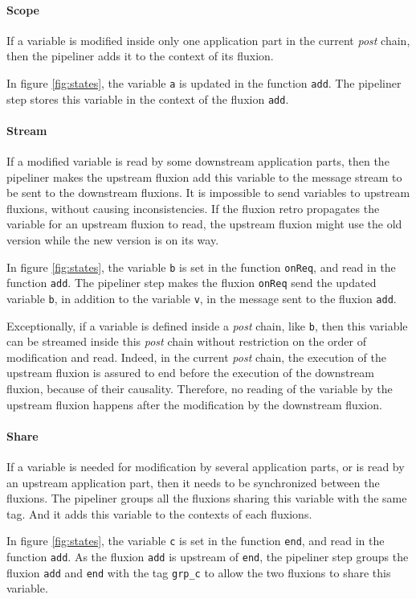 \paragraph{Scope}
If a variable is modified inside only one application part in the current \textit{post} chain, then the pipeliner adds it to the context of its fluxion.

In figure \ref{fig:states}, the variable \texttt{a} is updated in the function \texttt{add}.
The pipeliner step stores this variable in the context of the fluxion \texttt{add}.

\paragraph{Stream}
If a modified variable is read by some downstream application parts, then the pipeliner makes the upstream fluxion add this variable to the message stream to be sent to the downstream fluxions.
It is impossible to send variables to upstream flux\-ions, without causing inconsistencies.
If the fluxion retro propagates the variable for an upstream fluxion to read, the upstream fluxion might use the old version while the new version is on its way.

In figure \ref{fig:states}, the variable \texttt{b} is set in the function \texttt{onReq}, and read in the function \texttt{add}.
The pipeliner step makes the fluxion \texttt{onReq} send the updated variable \texttt{b}, in addition to the variable \texttt{v}, in the message sent to the fluxion \texttt{add}.

Exceptionally, if a variable is defined inside a \textit{post} chain, like \texttt{b}, then this variable can be streamed inside this \textit{post} chain without restriction on the order of modification and read.
Indeed, in the current \textit{post} chain, the execution of the upstream fluxion is assured to end before the execution of the downstream fluxion, because of their causality.
Therefore, no reading of the variable by the upstream fluxion happens after the modification by the downstream fluxion.

\paragraph{Share}
If a variable is needed for modification by several application parts, or is read by an upstream application part, then it needs to be synchronized between the fluxions.
The pipeliner groups all the fluxions sharing this variable with the same tag.
And it adds this variable to the contexts of each fluxions.

In figure \ref{fig:states}, the variable \texttt{c} is set in the function \texttt{end}, and read in the function \texttt{add}.
As the fluxion \texttt{add} is upstream of \texttt{end}, the pipeliner step groups the fluxion \texttt{add} and \texttt{end} with the tag \texttt{grp\_c} to allow the two fluxions to share this variable.